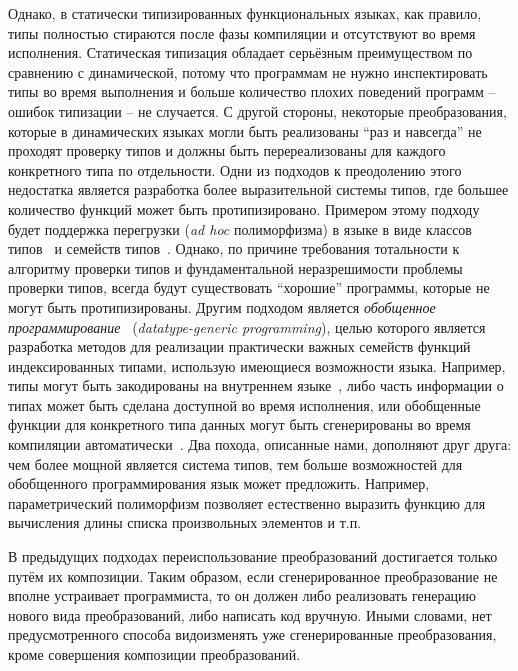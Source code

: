  Однако, в статически типизированных функциональных языках, как правило, типы полностью стираются 
 после фазы компиляции и отсутствуют во время исполнения. Статическая типизация обладает серьёзным преимуществом по сравнению с динамической, потому что программам
 не нужно инспектировать типы во время выполнения и больше количество плохих поведений программ -- ошибок типизации -- не случается. С другой стороны, некоторые преобразования, которые в динамических языках могли быть реализованы ``раз и навсегда'' не проходят проверку типов и должны быть перереализованы для каждого конкретного типа по отдельности. Одни из подходов к преодолению этого недостатка является разработка более выразительной системы типов, где большее количество функций может быть протипизировано. Примером этому подходу будет поддержка перегрузки (\emph{ad hoc} полиморфизма) в языке \haskell в виде классов 
 типов~\cite{TypeClasses} и семейств типов~\cite{TypeFamilies}. Однако, по причине требования тотальности к алгоритму проверки типов и фундаментальной неразрешимости проблемы проверки типов, всегда будут существовать ``хорошие'' программы, которые
 не могут быть протипизированы. Другим подходом является \emph{обобщенное программирование}~\cite{DGP} (\emph{datatype-generic programming}), целью которого является разработка методов для реализации практически важных семейств функций
 индексированных типами, использую имеющиеся возможности языка. Например, типы могут быть закодированы на внутреннем языке~\cite{Hinze,InstantGenerics,GenericOCaml}, либо часть информации о типах может быть сделана доступной во время исполнения, или 
 обобщенные функции для конкретного типа данных могут быть сгенерированы во время
 компиляции автоматически~\cite{Yallop,PPXLib}. Два похода, описанные нами, дополняют друг друга: чем более мощной является система типов, тем больше возможностей для обобщенного программирования язык может предложить. Например, параметрический полиморфизм позволяет естественно выразить функцию для вычисления длины списка произвольных элементов и т.п.
 
 
 В предыдущих подходах переиспользование преобразований достигается только путём их композиции. Таким образом, если 
 сгенерированное преобразование не вполне устраивает программиста, то он должен либо реализовать генерацию нового вида преобразований, либо написать код вручную. Иными словами, нет предусмотренного способа видоизменять уже сгенерированные преобразования, кроме совершения композиции преобразований.
 
